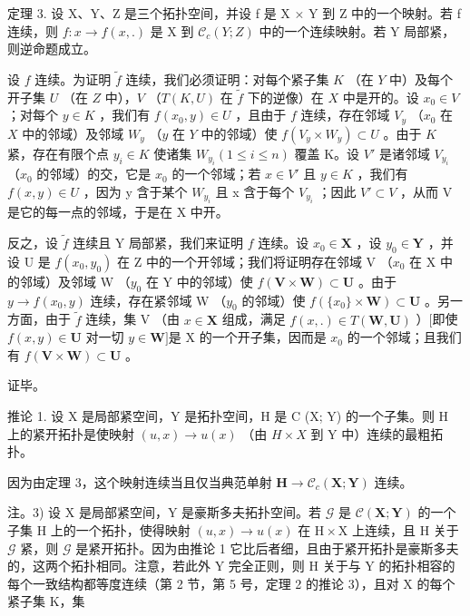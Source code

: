 定理 3. 设 X、Y、Z 是三个拓扑空间，并设 f 是 X × Y 到 Z 中的一个映射。若 f 连续，则 \(f: x \to f(x, .)\) 是 X 到 \(\mathcal{C}_{c}(Y; Z)\) 中的一个连续映射。若 Y 局部紧，则逆命题成立。

设 \(f\) 连续。为证明 \(\tilde{f}\) 连续，我们必须证明：对每个紧子集 \(K\) （在 \(Y\) 中）及每个开子集 \(U\) （在 \(Z\) 中），\(V\) （\(T(K, U)\) 在 \(\tilde{f}\) 下的逆像）在 \(X\) 中是开的。设 \(x_0 \in V\) ；对每个 \(y \in K\) ，我们有 \(f(x_0, y) \in U\) ，且由于 \(f\) 连续，存在邻域 \(V_y\) （\(x_0\) 在 \(X\) 中的邻域）及邻域 \(W_y\) （\(y\) 在 \(Y\) 中的邻域）使 \(f(V_y \times W_y) \subset U\) 。由于 \(K\) 紧，存在有限个点 \(y_{i} \in K\) 使诸集 \(W_{y_{i}}(1 \leqslant i \leqslant n)\) 覆盖 K。设 \(V'\) 是诸邻域 \(V_{y_{i}}\) （\(x_{0}\) 的邻域）的交，它是 \(x_{0}\) 的一个邻域；若 \(x \in V'\) 且 \(y \in K\) ，我们有 \(f(x, y) \in U\) ，因为 y 含于某个 \(W_{y_{i}}\) 且 x 含于每个 \(V_{y_{i}}\) ；因此 \(V' \subset V\) ，从而 V 是它的每一点的邻域，于是在 X 中开。

反之，设 \(\tilde{f}\) 连续且 Y 局部紧，我们来证明 \(f\) 连续。设 \(x_0 \in \mathbf{X}\) ，设 \(y_0 \in \mathbf{Y}\) ，并设 U 是 \(f(x_0, y_0)\) 在 Z 中的一个开邻域；我们将证明存在邻域 V （\(x_0\) 在 X 中的邻域）及邻域 W （\(y_0\) 在 Y 中的邻域）使 \(f(\mathbf{V} \times \mathbf{W}) \subset \mathbf{U}\) 。由于 \(y \to f(x_0, y)\) 连续，存在紧邻域 W （\(y_0\) 的邻域）使 \(f(\{x_0\} \times \mathbf{W}) \subset \mathbf{U}\) 。另一方面，由于 \(\tilde{f}\) 连续，集 V （由 \(x \in \mathbf{X}\) 组成，满足 \(f(x, .) \in T(\mathbf{W}, \mathbf{U})\) ）{[}即使 \(f(x, y) \in \mathbf{U}\) 对一切 \(y \in \mathbf{W}]\)是 X 的一个开子集，因而是 \(x_0\) 的一个邻域；且我们有 \(f(\mathbf{V} \times \mathbf{W}) \subset \mathbf{U}\) 。

证毕。

推论 1. 设 X 是局部紧空间，Y 是拓扑空间，H 是 C (X; Y) 的一个子集。则 H 上的紧开拓扑是使映射 \((u, x) \to u(x)\) （由 \(H \times X\) 到 Y 中）连续的最粗拓扑。

因为由定理 3，这个映射连续当且仅当典范单射 \(\mathbf{H} \to \mathcal{C}_c(\mathbf{X}; \mathbf{Y})\) 连续。

注。3) 设 X 是局部紧空间，Y 是豪斯多夫拓扑空间。若 \(\mathcal{G}\) 是 \(\mathcal{C}(\mathbf{X};\mathbf{Y})\) 的一个子集 H 上的一个拓扑，使得映射 \((u,x)\to u(x)\) 在 \(\mathrm{H}\times \mathrm{X}\) 上连续，且 H 关于 \(\mathcal{G}\) 紧，则 \(\mathcal{G}\) 是紧开拓扑。因为由推论 1 它比后者细，且由于紧开拓扑是豪斯多夫的，这两个拓扑相同。注意，若此外 Y 完全正则，则 H 关于与 Y 的拓扑相容的每个一致结构都等度连续（第 2 节，第 5 号，定理 2 的推论 3），且对 X 的每个紧子集 K，集

